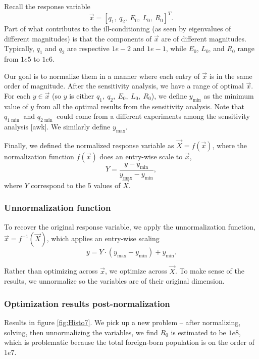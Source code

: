 \documentclass[sn-mathphys,Numbered]{sn-jnl}%
\theoremstyle{thmstyleone}%
\theoremstyle{thmstyletwo}%
\theoremstyle{thmstylethree}%
\begin{document}
\newcommand{\T}{^T}
\newcommand{\vx}{\vec{x}}
\newcommand{\vX}{\vec{X}}
\newcommand{\xresponse}{[q_1,~q_2,~E_0,~L_0,~R_0]\T.}
Recall the response variable  $$\vec{x} = [q_1,~q_2,~E_0,~L_0,~R_0]\T.$$
Part of what contributes to the ill-conditioning (as seen by eigenvalues of different magnitudes) is that the components of $\vx$ are of different magnitudes.  Typically, $q_1$ and $q_2$ are respective $1e-2$ and $1e-1$, while $E_0$, $L_0$, and $R_0$ range from $1e5$ to $1e6$.

\newcommand{\ymin}{y_{\min}}
\newcommand{\ymax}{y_{\max}}

Our goal is to normalize them in a manner where each entry of $\vec{x}$ is in the same order of magnitude.  After the sensitivity analysis, we have a range of optimal $\vx$.  For each $y \in \vec{x}$ (so $y$ is either $q_1,~q_2,~E_0,~L_0,~R_0$),  we define $\ymin$ as the minimum value of $y$ from all the optimal results from the sensitivity analysis.  Note that $q_{1\min}$ and $q_{2\min}$ could come from a different experiments among the sensitivity analysis [awk].  We similarly define $\ymax$.

Finally, we defined the normalized response variable as $\vX=f(\vx)$, where the normalization function $f(\vx)$ does an entry-wise scale to $\vx$,
$$ Y = \frac{y- y_{\min}}{y_{\max} - y_{\min}} , $$
where $Y$ correspond to the 5 values of $\vX$. 


\subsubsection{Unnormalization function}

\newcommand{\inv}{^{-1}}
To recover the original response variable, we apply the unnormalization function, $\vx = f\inv(\vX)$, which applies an entry-wise scaling
$$ y = Y\cdot(\ymax-\ymin) + \ymin. $$

Rather than optimizing across $\vx$, we optimize across $\vX$.  To make sense of the results, we unnormalize so the variables are of their original dimension.

\subsubsection{Optimization results post-normalization}

Results in figure \ref{fig:Histo7}.  We pick up a new problem -- after normalizing, solving, then unnormalizing the variables, we find $R_0$ is estimated to be $1e8$, which is problematic because the total foreign-born population is on the order of $1e7$.  
\end{document}
